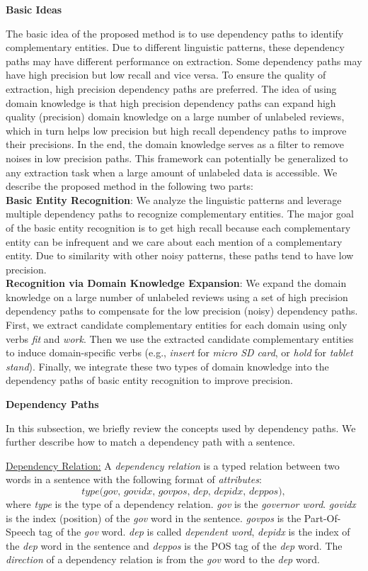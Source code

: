 \textbf{Basic Ideas}

The basic idea of the proposed method is to use dependency paths to identify complementary entities. Due to different linguistic patterns, these dependency paths may have different performance on extraction. Some dependency paths may have high precision but low recall and vice versa. To ensure the quality of extraction, high precision dependency paths are preferred. The idea of using domain knowledge is that high precision dependency paths can expand high quality (precision) domain knowledge on a large number of unlabeled reviews, which in turn helps low precision but high recall dependency paths to improve their precisions. In the end, the domain knowledge serves as a filter to remove noises in low precision paths. This framework can potentially be generalized to any extraction task when a large amount of unlabeled data is accessible. We describe the proposed method in the following two parts:\\
\textbf{Basic Entity Recognition}: We analyze the linguistic patterns and leverage multiple dependency paths to recognize complementary entities. The major goal of the basic entity recognition is to get high recall because each complementary entity can be infrequent and we care about each mention of a complementary entity. Due to similarity with other noisy patterns, these paths tend to have low precision.\\
\textbf{Recognition via Domain Knowledge Expansion}: We expand the domain knowledge on a large number of unlabeled reviews using a set of high precision dependency paths to compensate for the low precision (noisy) dependency paths. First, we extract candidate complementary entities for each domain using only verbs \textit{fit} and \textit{work}. Then we use the extracted candidate complementary entities to induce domain-specific verbs (e.g., \textit{insert} for \textit{micro SD card}, or \textit{hold} for \textit{tablet stand}). Finally, we integrate these two types of domain knowledge into the dependency paths of basic entity recognition to improve precision.

\textbf{Dependency Paths}

In this subsection, we briefly review the concepts used by dependency paths. We further describe how to match a dependency path with a sentence.
 
\underline{Dependency Relation:} \label{defn:dr} 
A \textit{dependency relation} is a typed relation between two words in a sentence with the following format of \emph{attributes}: 
$$\textit{type(gov, govidx, govpos, dep, depidx, deppos)}, $$
where \textit{type} is the type of a dependency relation.
\textit{gov} is the \emph{governor word}.
\textit{govidx} is the index (position) of the \textit{gov} word in the sentence.
\textit{govpos} is the Part-Of-Speech tag of the \textit{gov} word.
\textit{dep} is called \emph{dependent word}, \textit{depidx} is the index of the \textit{dep} word in the sentence and \textit{deppos} is the POS tag of the \textit{dep} word. The \emph{direction} of a dependency relation is from the \textit{gov} word to the \textit{dep} word.

